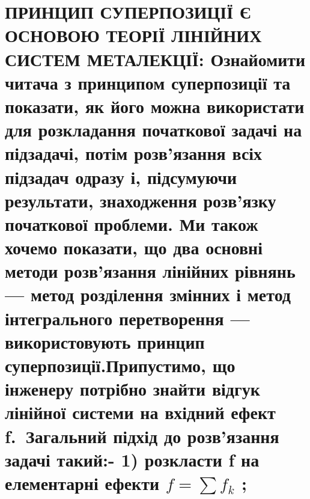 \documentclass[
  ukrainian,
]{article}
\begin{document}
\section{\texorpdfstring{ПРИНЦИП СУПЕРПОЗИЦІЇ Є ОСНОВОЮ ТЕОРІЇ ЛІНІЙНИХ
СИСТЕМ МЕТАЛЕКЦІЇ: Ознайомити читача з принципом суперпозиції та
показати, як його можна використати для розкладання початкової задачі на
підзадачі, потім розв'язання всіх підзадач одразу і, підсумуючи
результати, знаходження розв'язку початкової проблеми. Ми також хочемо
показати, що два основні методи розв'язання лінійних рівнянь --- метод
розділення змінних і метод інтегрального перетворення --- використовують
принцип суперпозиції.Припустимо, що інженеру потрібно знайти відгук
лінійної системи на вхідний ефект f.~Загальний підхід до розв'язання
задачі такий:- 1) розкласти f на елементарні ефекти \(f = \sum f_k\)
;}{ПРИНЦИП СУПЕРПОЗИЦІЇ Є ОСНОВОЮ ТЕОРІЇ ЛІНІЙНИХ СИСТЕМ МЕТАЛЕКЦІЇ: Ознайомити читача з принципом суперпозиції та показати, як його можна використати для розкладання початкової задачі на підзадачі, потім розв'язання всіх підзадач одразу і, підсумуючи результати, знаходження розв'язку початкової проблеми. Ми також хочемо показати, що два основні методи розв'язання лінійних рівнянь --- метод розділення змінних і метод інтегрального перетворення --- використовують принцип суперпозиції.Припустимо, що інженеру потрібно знайти відгук лінійної системи на вхідний ефект f.~Загальний підхід до розв'язання задачі такий:- 1) розкласти f на елементарні ефекти f = \textbackslash sum f\_k }}
\end{document}
